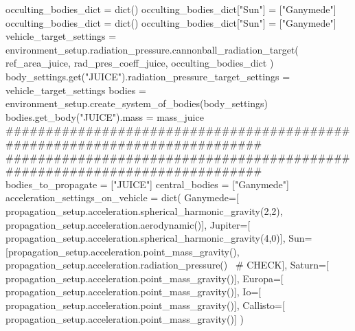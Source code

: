 {}
\markdownRendererSectionEnd \markdownRendererSectionBegin
{}\markdownRendererInterblockSeparator
{}occulting_bodies_dict = dict() occulting_bodies_dict["Sun"] = ["Ganymede"]\markdownRendererInterblockSeparator
{}
\markdownRendererSectionEnd \markdownRendererSectionBegin
{}\markdownRendererInterblockSeparator
{}
\markdownRendererSectionEnd \markdownRendererSectionBegin
{}\markdownRendererInterblockSeparator
{}occulting_bodies_dict = dict() occulting_bodies_dict["Sun"] = ["Ganymede"] vehicle_target_settings = environment_setup.radiation_pressure.cannonball_radiation_target( ref_area_juice, rad_pres_coeff_juice, occulting_bodies_dict )\markdownRendererInterblockSeparator
{}
\markdownRendererSectionEnd \markdownRendererSectionBegin
{}\markdownRendererInterblockSeparator
{}body_settings.get("JUICE").radiation_pressure_target_settings = vehicle_target_settings\markdownRendererInterblockSeparator
{}
\markdownRendererSectionEnd \markdownRendererSectionBegin
{}\markdownRendererInterblockSeparator
{}bodies = environment_setup.create_system_of_bodies(body_settings) bodies.get_body("JUICE").mass = mass_juice\markdownRendererInterblockSeparator
{}###########################################################################\markdownRendererInterblockSeparator
{}
\markdownRendererSectionEnd \markdownRendererSectionBegin
{}\markdownRendererInterblockSeparator
{}###########################################################################\markdownRendererInterblockSeparator
{}
\markdownRendererSectionEnd \markdownRendererSectionBegin
{}\markdownRendererInterblockSeparator
{}bodies_to_propagate = ["JUICE"] central_bodies = ["Ganymede"]\markdownRendererInterblockSeparator
{}
\markdownRendererSectionEnd \markdownRendererSectionBegin
{}\markdownRendererInterblockSeparator
{}acceleration_settings_on_vehicle = dict( Ganymede=[ propagation_setup.acceleration.spherical_harmonic_gravity(2,2), propagation_setup.acceleration.aerodynamic()], Jupiter=[ propagation_setup.acceleration.spherical_harmonic_gravity(4,0)], Sun=[propagation_setup.acceleration.point_mass_gravity(), propagation_setup.acceleration.radiation_pressure()  # CHECK], Saturn=[ propagation_setup.acceleration.point_mass_gravity()], Europa=[ propagation_setup.acceleration.point_mass_gravity()], Io=[ propagation_setup.acceleration.point_mass_gravity()], Callisto=[ propagation_setup.acceleration.point_mass_gravity()] )\markdownRendererInterblockSeparator
